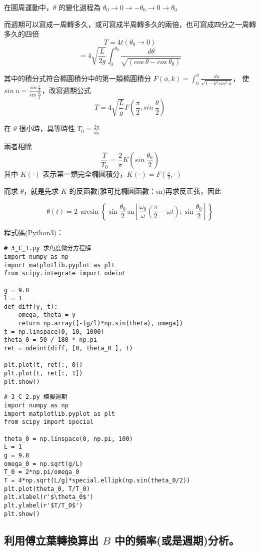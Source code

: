 \documentclass[UTF8,a4paper,12pt]{article}
\begin{document}
在圓周運動中，$\theta$ 的變化過程為 $\theta_0 \rightarrow 0 \rightarrow -\theta_0 \rightarrow 0 \rightarrow \theta_0$

而週期可以寫成一周轉多久，或可寫成半周轉多久的兩倍，也可寫成四分之一周轉多久的四倍
$$T = 4t(\theta_0 \rightarrow 0)$$
$$ = 4 \sqrt{\frac{L}{2g}} \int^{\theta_0}_0 \frac{d\theta}{\sqrt{(cos\ \theta - cos\ \theta_0)}} $$

其中的積分式符合橢圓積分中的第一類橢圓積分 $F(\phi,k) = \int^{\phi}_0 \frac{du}{\sqrt{1-k^2sin^2\ u}} $，
使$sin\ u=\frac{sin\ \frac{\pi}{2}}{sin\ \frac{\theta_0}{2}}$，改寫週期公式 
$$T = 4\sqrt{\frac{L}{g}}F(\frac{\pi}{2},sin\ \frac{\theta}{2})$$

在 $\theta$ 很小時，具等時性 $T_0 = \frac{2\pi}{\omega_0}$

兩者相除
$$\frac{T}{T_0} = \frac{2}{\pi}K(sin\ \frac{\theta_0}{2})$$
其中 $K(\cdot)$ 表示第一類完全橢圓積分，$K(\cdot) = F(\frac{\pi}{2}, \cdot )$

而求 $\theta$，就是先求 $K$ 的反函數(雅可比橢圓函數：sn)再求反正弦，因此

$$\theta (t) = 2\,\arcsin \left\{ \sin\frac{\theta_0}{2} \, \mbox{sn} \left[ \frac{\omega_0}{\omega}\left(\frac{\pi}{2} - \omega t \right) 
 ; \sin \frac{\theta_0}{2} \right] \right\}$$


程式碼(Python3)：

\begin{lstlisting}
# 3_C_1.py 求角度微分方程解
import numpy as np
import matplotlib.pyplot as plt
from scipy.integrate import odeint

g = 9.8
l = 1
def diff(y, t):
    omega, theta = y
    return np.array([-(g/l)*np.sin(theta), omega])
t = np.linspace(0, 10, 1000)
theta_0 = 50 / 180 * np.pi
ret = odeint(diff, [0, theta_0 ], t)

plt.plot(t, ret[:, 0])
plt.plot(t, ret[:, 1])
plt.show()
\end{lstlisting}

\begin{lstlisting}
# 3_C_2.py 模擬週期
import numpy as np
import matplotlib.pyplot as plt
from scipy import special

theta_0 = np.linspace(0, np.pi, 100)
L = 1
g = 9.8
omega_0 = np.sqrt(g/L)
T_0 = 2*np.pi/omega_0
T = 4*np.sqrt(L/g)*special.ellipk(np.sin(theta_0/2))
plt.plot(theta_0, T/T_0)
plt.xlabel(r'$\theta_0$')
plt.ylabel(r'$T/T_0$')
plt.show()

\end{lstlisting}


\subsection{利用傅立葉轉換算出 \texorpdfstring{$B$}{B} 中的頻率(或是週期)分析。}
\end{document}
